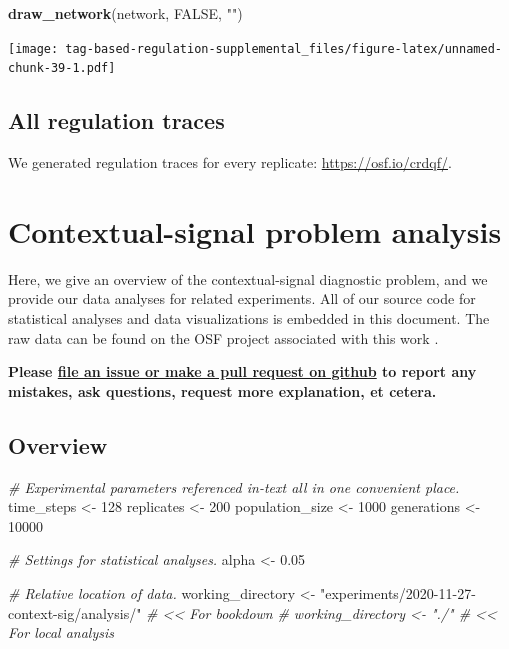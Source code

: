 \documentclass[
]{book}
\newenvironment{Shaded}{\begin{snugshade}}{\end{snugshade}}
\newcommand{\CommentTok}[1]{\textcolor[rgb]{0.56,0.35,0.01}{\textit{#1}}}
\newcommand{\DecValTok}[1]{\textcolor[rgb]{0.00,0.00,0.81}{#1}}
\newcommand{\FloatTok}[1]{\textcolor[rgb]{0.00,0.00,0.81}{#1}}
\newcommand{\KeywordTok}[1]{\textcolor[rgb]{0.13,0.29,0.53}{\textbf{#1}}}
\newcommand{\NormalTok}[1]{#1}
\newcommand{\OtherTok}[1]{\textcolor[rgb]{0.56,0.35,0.01}{#1}}
\newcommand{\StringTok}[1]{\textcolor[rgb]{0.31,0.60,0.02}{#1}}
\begin{document}
\begin{Shaded}
\begin{Highlighting}[]
\KeywordTok{draw\_network}\NormalTok{(network, }\OtherTok{FALSE}\NormalTok{, }\StringTok{""}\NormalTok{)}
\end{Highlighting}
\end{Shaded}

\texttt{[image: tag-based-regulation-supplemental\_files/figure-latex/unnamed-chunk-39-1.pdf]}

\hypertarget{all-regulation-traces}{%
\section{All regulation traces}\label{all-regulation-traces}}

We generated regulation traces for every replicate: \url{https://osf.io/crdqf/}.

\hypertarget{contextual-signal-problem-analysis}{%
\chapter{Contextual-signal problem analysis}\label{contextual-signal-problem-analysis}}

Here, we give an overview of the contextual-signal diagnostic problem, and we provide our data analyses for related experiments.
All of our source code for statistical analyses and data visualizations is embedded in this document.
The raw data can be found on the OSF project associated with this work \citep{Lalejini_Moreno_Ofria_Data_2020}.

\textbf{Please \href{https://github.com/amlalejini/Tag-based-Genetic-Regulation-for-LinearGP/issues}{file an issue or make a pull request on github} to report any mistakes, ask questions, request more explanation, et cetera.}

\hypertarget{overview-1}{%
\section{Overview}\label{overview-1}}

\begin{Shaded}
\begin{Highlighting}[]
\CommentTok{\# Experimental parameters referenced in{-}text all in one convenient place.}
\NormalTok{time\_steps \textless{}{-}}\StringTok{ }\DecValTok{128}
\NormalTok{replicates \textless{}{-}}\StringTok{ }\DecValTok{200}
\NormalTok{population\_size \textless{}{-}}\StringTok{ }\DecValTok{1000}
\NormalTok{generations \textless{}{-}}\StringTok{ }\DecValTok{10000}

\CommentTok{\# Settings for statistical analyses.}
\NormalTok{alpha \textless{}{-}}\StringTok{ }\FloatTok{0.05}

\CommentTok{\# Relative location of data.}
\NormalTok{working\_directory \textless{}{-}}\StringTok{ "experiments/2020{-}11{-}27{-}context{-}sig/analysis/"} \CommentTok{\# \textless{}\textless{} For bookdown}
\CommentTok{\# working\_directory \textless{}{-} "./"                                         \# \textless{}\textless{} For local analysis}
\end{Highlighting}
\end{Shaded}
\end{document}
